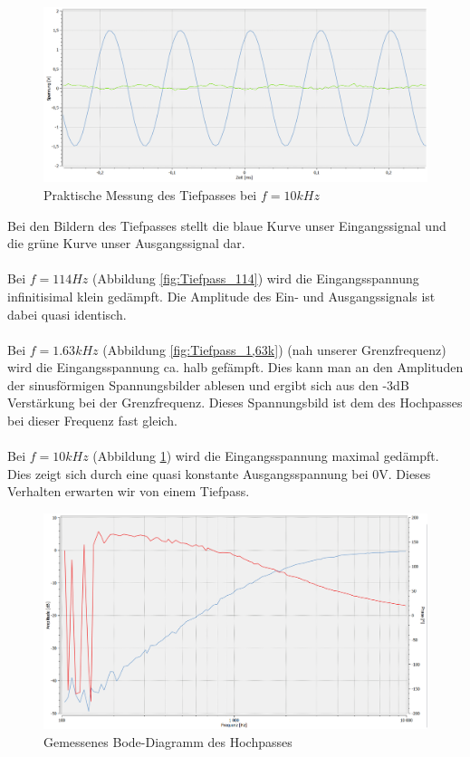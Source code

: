 \newpage
\begin{figure}[htb]
    \includegraphics[width=13cm]{./pictures/Messungen/Tiefpass_10k}
    \caption{Praktische Messung des Tiefpasses bei $f=10kHz$}
    \label{fig:Tiefpass_10k}
\end{figure}

Bei den Bildern des Tiefpasses stellt die blaue Kurve unser Eingangssignal und die grüne Kurve unser Ausgangssignal dar.
\\
\\
Bei $f=114Hz$ (Abbildung \ref{fig:Tiefpass_114}) wird die Eingangsspannung infinitisimal klein gedämpft.  Die Amplitude des Ein- und Ausgangssignals ist dabei quasi identisch.
\\
\\
Bei $f=1.63kHz$ (Abbildung \ref{fig:Tiefpass_1,63k}) (nah unserer Grenzfrequenz) wird die Eingangsspannung ca. halb gefämpft. Dies kann man an den Amplituden der sinusförmigen Spannungsbilder ablesen und ergibt sich aus den -3dB Verstärkung bei der Grenzfrequenz. Dieses Spannungsbild ist dem des Hochpasses bei dieser Frequenz fast gleich.
\\
\\
Bei $f=10kHz$ (Abbildung \ref{fig:Tiefpass_10k}) wird die Eingangsspannung maximal gedämpft. Dies zeigt sich durch eine quasi konstante Ausgangsspannung bei 0V. Dieses Verhalten erwarten wir von einem Tiefpass.

\begin{figure}[htb]
    \includegraphics[width=13cm]{./pictures/Messungen/Hochpass_Bode_Test}
    \caption{Gemessenes Bode-Diagramm des Hochpasses}
    \label{fig:Hochpass_Bode_Test}
\end{figure}


